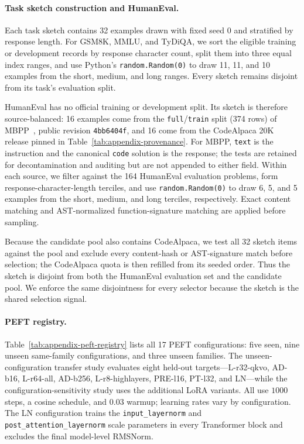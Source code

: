 \paragraph{Task sketch construction and HumanEval.}
Each task sketch contains 32 examples drawn with fixed seed 0 and stratified by
response length. For GSM8K, MMLU, and TyDiQA, we sort the eligible training or
development records by response character count, split them into three equal
index ranges, and use Python's \texttt{random.Random(0)} to draw 11, 11, and 10
examples from the short, medium, and long ranges. Every sketch remains disjoint
from its task's evaluation split.

HumanEval has no official training or development split. Its sketch is therefore
source-balanced: 16 examples come from the \texttt{full}/\texttt{train} split
(374 rows) of MBPP~\cite{austin2021program}, public revision
\texttt{4bb6404f}, and 16 come from the CodeAlpaca 20K release pinned in
Table~\ref{tab:appendix-provenance}. For MBPP, \texttt{text} is the instruction
and the canonical \texttt{code} solution is the response; the tests are retained
for decontamination and auditing but are not appended to either field. Within
each source, we filter against the 164 HumanEval evaluation problems, form
response-character-length terciles, and use \texttt{random.Random(0)} to draw 6,
5, and 5 examples from the short, medium, and long terciles, respectively. Exact
content matching and AST-normalized function-signature matching are applied
before sampling.

Because the candidate pool also contains CodeAlpaca, we test all 32 sketch items
against the pool and exclude every content-hash or AST-signature match before
selection; the CodeAlpaca quota is then refilled from its seeded order. Thus the
sketch is disjoint from both the HumanEval evaluation set and the candidate
pool. We enforce the same disjointness for every selector because the sketch is
the shared selection signal.

\paragraph{PEFT registry.}
Table~\ref{tab:appendix-peft-registry} lists all 17 PEFT configurations:
five seen, nine unseen same-family configurations, and three unseen families.
The unseen-configuration transfer study evaluates eight held-out
targets---L-r32-qkvo, AD-b16, L-r64-all, AD-b256, L-r8-highlayers, PRE-l16,
PT-l32, and LN---while the configuration-sensitivity study uses the additional
LoRA variants. All use $1000$ steps, a cosine schedule, and $0.03$ warmup;
learning rates vary by configuration.
The LN configuration trains the \texttt{input\_layernorm} and
\texttt{post\_attention\_layernorm} scale parameters in every Transformer
block and excludes the final model-level RMSNorm.


